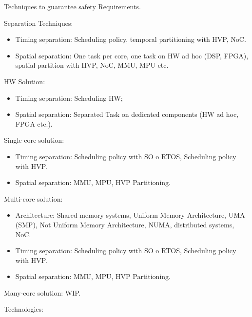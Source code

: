 



Techniques to guarantee safety Requirements. \par
Separation Techniques:
%
\begin{itemize}
    \item Timing separation:  Scheduling policy, temporal partitioning with HVP, NoC.
    \item Spatial separation: One task per core, one task on HW ad hoc (DSP, FPGA), spatial partition with HVP, NoC, MMU, MPU etc. 
\end{itemize}
%
HW Solution: 
%
\begin{itemize}
    \item  Timing separation: Scheduling HW; 
    \item Spatial separation: Separated Task on dedicated components (HW ad hoc, FPGA etc.). 
\end{itemize}
%
Single-core solution: 
%
\begin{itemize}
    \item Timing separation:  Scheduling policy with SO o RTOS, Scheduling policy with HVP.
    \item Spatial separation: MMU, MPU, HVP Partitioning. 
\end{itemize}
%
Multi-core solution: 
%
\begin{itemize}
    \item Architecture: Shared memory systems, Uniform Memory Architecture, UMA (SMP), Not Uniform Memory Architecture, NUMA, distributed systems, NoC.
    \item Timing separation:  Scheduling policy with SO o RTOS, Scheduling policy with HVP.
    \item Spatial separation: MMU, MPU, HVP Partitioning. 
\end{itemize}
%
Many-core solution: WIP. \par
Technologies:
%

